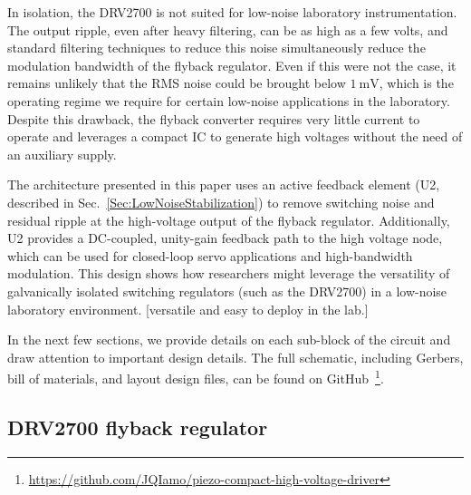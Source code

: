 \documentclass[aip,rsi,reprint]{revtex4-1} %
\begin{document}
In isolation, the DRV2700 is not suited for low-noise laboratory instrumentation. 
The output ripple, even after heavy filtering, can be as high as a few volts, and standard filtering techniques to reduce this noise simultaneously reduce the modulation bandwidth of the flyback regulator.
Even if this were not the case, it remains unlikely that the RMS noise could be brought below $\SI{1}{\milli\volt}$, which is the operating regime we require for certain low-noise applications in the laboratory.
Despite this drawback, the flyback converter requires very little current to operate and leverages a compact IC to generate high voltages without the need of an auxiliary supply.

The architecture presented in this paper uses an active feedback element (U2, described in Sec.~\ref{Sec:LowNoiseStabilization}) to remove switching noise and residual ripple at the high-voltage output of the flyback regulator.
Additionally, U2 provides a DC-coupled, unity-gain feedback path to the high voltage node, which can be used for closed-loop servo applications and high-bandwidth modulation.
This design shows how researchers might leverage the versatility of galvanically isolated switching regulators (such as the DRV2700) in a low-noise laboratory environment. [versatile and easy to deploy in the lab.]

In the next few sections, we provide details on each sub-block of the circuit and draw attention to important design details.
The full schematic, including Gerbers, bill of materials, and layout design files, can be found on GitHub~\footnote{\protect\url{https://github.com/JQIamo/piezo-compact-high-voltage-driver}}.


\subsection{DRV2700 flyback regulator}
\label{Sec:DRV2700}
\end{document}
